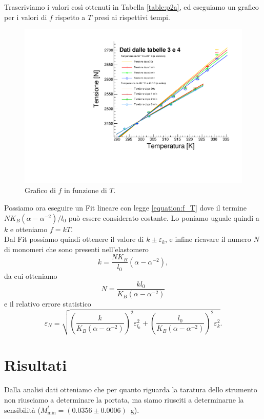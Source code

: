 \documentclass[italian, a4paper, 10pt, twocolumn]{../../style/lab_unige}
\newcommand{\reftab}[1]{Tabella {\ref{#1}}}%
\newcommand{\mstdErr}[1]{\varepsilon_{#1}}
\begin{document}
    Trascriviamo i valori così ottenuti in \reftab{table:p2a}, ed eseguiamo un grafico per i valori di $f$ rispetto a $T$ presi ai rispettivi tempi. 

    \begin{figure}
        \centering
        \includegraphics[width=\linewidth]{plot_istresi.pdf}
        \caption{Grafico di $f$ in funzione di $T$.}
        \label{figure:plot_isteresi}
    \end{figure}

    Possiamo ora eseguire un Fit lineare con legge \ref{equation:f_T} dove il termine $NK_B(\alpha-\alpha^{-2})/l_0$ può essere considerato costante. Lo poniamo uguale quindi a $k$ e otteniamo $f=kT$.\\
    Dal Fit possiamo quindi ottenere il valore di $k\pm\mstdErr{k}$, e infine ricavare il numero $N$ di monomeri che sono presenti nell'elastomero\[k=\frac{NK_B}{l_0}\left(\alpha-\alpha^{-2}\right),\] da cui otteniamo \[N=\frac{kl_0}{K_B\left(\alpha-\alpha^{-2}\right)}\] e il relativo errore statistico \[\mstdErr{N}=\sqrt{\left(\frac{k}{K_B\left(\alpha-\alpha^{-2}\right)}\right)^2\mstdErr{l_0}^2+\left(\frac{l_0}{K_B\left(\alpha-\alpha^{-2}\right)}\right)^2\mstdErr{k}^2}.\]

    \section{Risultati}
    \label{section:results}

    Dalla analisi dati otteniamo che per quanto riguarda la taratura dello strumento non riusciamo a determinare la portata, ma siamo riusciti a determinarne la sensibilità ($M_{\text{min}}^t = (0.0356\pm0.0006)$~g).
\end{document}
